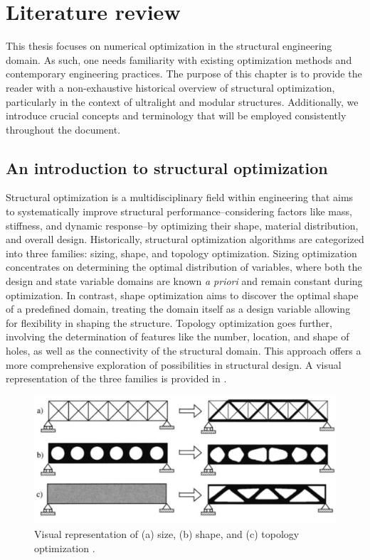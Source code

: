 \setchapterpreamble[u]{\margintoc}
\glsresetall %

\chapter{Literature review}
This thesis focuses on numerical optimization in the structural engineering domain. As such, one needs familiarity with existing optimization methods and contemporary engineering practices. The purpose of this chapter is to provide the reader with a non-exhaustive historical overview of structural optimization, particularly in the context of ultralight and modular structures. Additionally, we introduce crucial concepts and terminology that will be employed consistently throughout the document.

\section{An introduction to structural optimization}
Structural optimization is a multidisciplinary field within engineering that aims to systematically improve structural performance--considering factors like mass, stiffness, and dynamic response--by optimizing their shape, material distribution, and overall design. Historically, structural optimization algorithms are categorized into three families: sizing, shape, and topology optimization. Sizing optimization concentrates on determining the optimal distribution of variables, where both the design and state variable domains are known \textit{a priori} and remain constant during optimization. In contrast, shape optimization aims to discover the optimal shape of a predefined domain, treating the domain itself as a design variable allowing for flexibility in shaping the structure. Topology optimization goes further, involving the determination of features like the number, location, and shape of holes, as well as the connectivity of the structural domain. This approach offers a more comprehensive exploration of possibilities in structural design. A visual representation of the three families is provided in .

\begin{figure}
    \centering
    \includegraphics[width=\linewidth]{figures/02_literature/opt_family.png}
    \caption{Visual representation of (a) size, (b) shape, and (c) topology optimization \cite{bendsoe_topology_2004}.}
    \label{fig:02_opt_fam}
\end{figure}

